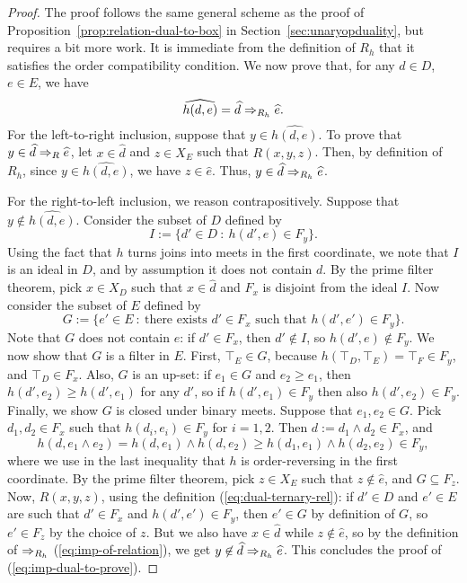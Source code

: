 \begin{proof}
  The proof follows the same general scheme as the proof of Proposition~\ref{prop:relation-dual-to-box} in Section~\ref{sec:unaryopduality}, but requires a bit more work. It is immediate from the definition of $R_h$ that it satisfies the order compatibility condition. We now prove that, for any $d \in D$, $e \in E$, we have
  \begin{equation}\label{eq:imp-dual-to-prove}
    \widehat{h(d,e)} = \widehat{d} \Rightarrow_{R_h} \widehat{e}.
  \end{equation}
  For the left-to-right inclusion, suppose that $y \in \widehat{h(d,e)}$. To prove that $y \in \widehat{d} \Rightarrow_R \widehat{e}$, let $x \in \widehat{d}$ and $z \in X_E$ such that $R(x,y,z)$. Then, by definition of $R_h$, since $y \in \widehat{h(d,e)}$, we have $z \in \widehat{e}$. Thus, $y \in \widehat{d} \Rightarrow_{R_h} \widehat{e}$.

  For the right-to-left inclusion, we reason contrapositively. Suppose that $y \not\in \widehat{h(d,e)}$. Consider the subset of $D$ defined by
  \[ I := \{d' \in D \ \colon \ h(d',e) \in F_y\}.\]
  Using the fact that $h$ turns joins into meets in the first coordinate, we note that $I$ is an ideal in $D$, and by assumption it does not contain $d$. By the prime filter theorem, pick $x \in X_D$ such that $x \in \widehat{d}$ and $F_x$ is disjoint from the ideal $I$. Now consider the subset of $E$ defined by
  \[ G := \{e' \in E \ \colon \ \text{there exists } d' \in F_x \text{ such that } h(d',e') \in F_y\}.\]
  Note that $G$ does not contain $e$: if $d' \in F_x$, then $d' \not\in I$, so $h(d',e) \not\in F_y$. We now show that $G$ is a filter in $E$. First, $\top_E \in G$, because $h(\top_D, \top_E) = \top_F \in F_y$, and $\top_D \in F_x$. Also, $G$ is an up-set: if $e_1 \in G$ and $e_2 \geq e_1$, then $h(d', e_2) \geq h(d', e_1)$ for any $d'$, so if $h(d', e_1) \in F_y$ then also $h(d', e_2) \in F_y$. Finally, we show $G$ is closed under binary meets. Suppose that $e_1, e_2 \in G$. Pick $d_1, d_2 \in F_x$ such that $h(d_i, e_i) \in F_y$ for $i = 1, 2$. Then $d := d_1 \wedge d_2 \in F_x$, and 
  \[ h(d, e_1 \wedge e_2) = h(d,e_1) \wedge h(d,e_2) \geq h(d_1,e_1) \wedge h(d_2,e_2) \in F_y,\] 
  where we use in the last inequality that $h$ is order-reversing in the first coordinate.
  By the prime filter theorem, pick $z \in X_E$ such that $z \not\in \widehat{e}$, and $G \subseteq F_z$. Now, $R(x,y,z)$, using the definition (\ref{eq:dual-ternary-rel}): if $d' \in D$ and $e' \in E$ are such that $d' \in F_x$ and $h(d',e') \in F_y$, then $e' \in G$ by definition of $G$, so $e' \in F_z$ by the choice of $z$. But we also have $x \in \widehat{d}$ while $z \not\in \widehat{e}$, so by the definition of $\Rightarrow_{R_h}$ (\ref{eq:imp-of-relation}), we get $y \not\in \widehat{d} \Rightarrow_{R_h} \widehat{e}$. This concludes the proof of (\ref{eq:imp-dual-to-prove}).
  

\end{proof}
